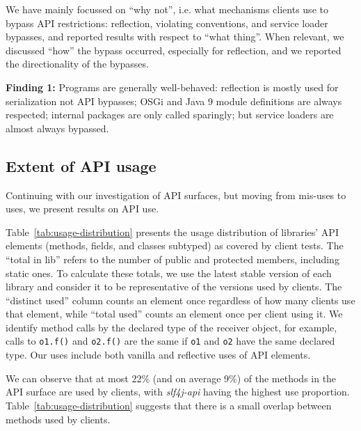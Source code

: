 We have mainly focussed on ``why not'', i.e. what mechanisms clients use to bypass API restrictions: reflection, violating conventions, and service loader bypasses, and reported results with respect to ``what thing''. When relevant, we discussed ``how'' the bypass occurred, especially for reflection, and we reported the directionality of the bypasses.

\begin{mdframed}[
  leftmargin=\parindent,
  rightmargin=\parindent,
  skipabove=\topsep,
  skipbelow=\topsep
  ]
{\bf Finding 1:} Programs are generally well-behaved: reflection is mostly used for serialization not API bypasses; OSGi and Java 9 module definitions are always respected; internal packages are only called sparingly; but service loaders are almost always bypassed.
\end{mdframed}

\subsection{Extent of API usage}
Continuing with our investigation of API surfaces, but moving from
mis-uses to uses, we present results on API use.

Table~\ref{tab:usage-distribution} presents the usage distribution of
libraries' API elements (methods, fields, and classes subtyped) as
covered by client tests. The ``total in lib'' refers to the number of
public and protected members, including static ones. To calculate these totals,
we use the latest stable version of each library and consider it to be representative of 
the versions used by clients.  The ``distinct used'' column counts an
element once regardless of how many clients use that element, while
``total used'' counts an element once per client using it. We identify method calls by the
declared type of the receiver object, for example, calls to {\tt o1.f()} and {\tt o2.f()} are the same
if {\tt o1} and {\tt o2} have the same declared type.
Our uses 
include both vanilla and reflective uses of API elements.



We can observe that at most 22\% (and on average 9\%) of the methods in the API surface
are used by clients, with \emph{slf4j-api} having the highest use proportion.
Table~\ref{tab:usage-distribution} suggests that there is a small overlap between methods
used by clients.

